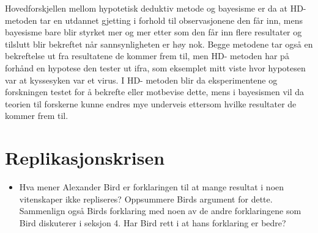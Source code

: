 \documentclass[
]{book}
\providecommand{\tightlist}{%
  \setlength{\itemsep}{0pt}\setlength{\parskip}{0pt}}
\begin{document}
Hovedforskjellen mellom hypotetisk deduktiv metode og bayesisme er da at HD- metoden tar en utdannet gjetting i forhold til observasjonene den får inn, mens bayesisme bare blir styrket mer og mer etter som den får inn flere resultater og tilslutt blir bekreftet når sannsynligheten er høy nok.
Begge metodene tar også en bekreftelse ut fra resultatene de kommer frem til, men HD- metoden har på forhånd en hypotese den tester ut ifra, som eksemplet mitt viste hvor hypotesen var at kyssesyken var et virus.
I HD- metoden blir da eksperimentene og forskningen testet for å bekrefte eller motbevise dette, mens i bayesismen vil da teorien til forskerne kunne endres mye underveis ettersom hvilke resultater de kommer frem til.

\hypertarget{replikasjonskrisen}{%
\section{Replikasjonskrisen}\label{replikasjonskrisen}}

\begin{itemize}
\tightlist
\item
  Hva mener Alexander Bird er forklaringen til at mange resultat i noen vitenskaper ikke repliseres?
  Oppsummere Birds argument for dette.
  Sammenlign også Birds forklaring med noen av de andre forklaringene som Bird diskuterer i seksjon 4.
  Har Bird rett i at hans forklaring er bedre?
\end{itemize}
\end{document}
